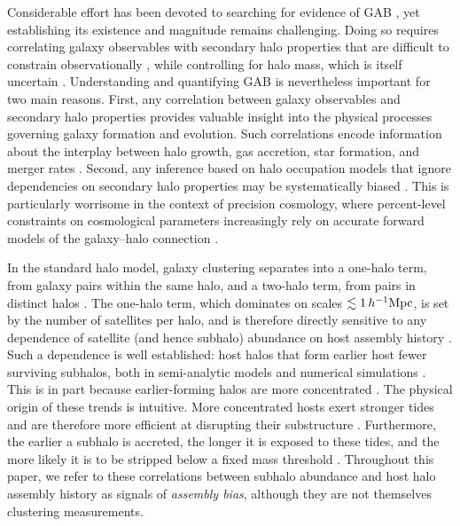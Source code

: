 \documentclass[twocolumn,apj,numberedappendix,twocolappendix,iop]{openjournal}
\begin{document}
Considerable effort has been devoted to searching for evidence of GAB \citep{Yang.etal.06, Berlind.etal.06, Tinker.etal.08, Hearin.etal.16, Zu.Mandelbaum.18}, yet establishing its existence and magnitude remains challenging. Doing so requires correlating galaxy observables with secondary halo properties that are difficult to constrain observationally \citep{Miyatake.etal.16, Zu.etal.17, Lin.etal.16, Sunayama.More.19}, while controlling for halo mass, which is itself uncertain \citep{Campbell.etal.15, Old.etal.15}. Understanding and quantifying GAB is nevertheless important for two main reasons. First, any correlation between galaxy observables and secondary halo properties provides valuable insight into the physical processes governing galaxy formation and evolution. Such correlations encode information about the interplay between halo growth, gas accretion, star formation, and merger rates \citep{Somerville.etal.15, Behroozi.etal.19}. Second, any inference based on halo occupation models that ignore dependencies on secondary halo properties may be systematically biased \citep{Zentner.etal.14, Hearin.etal.15}. This is particularly worrisome in the context of precision cosmology, where percent-level constraints on cosmological parameters increasingly rely on accurate forward models of the galaxy--halo connection \citep{Weinberg.etal.13, Hearin.etal.16, Mitra.vdBosch.25}.

In the standard halo model, galaxy clustering separates into a one-halo term, from galaxy pairs within the same halo, and a two-halo term, from pairs in distinct halos \citep{Seljak.00, Cooray.Sheth.02, vdBosch.etal.13}. The one-halo term, which dominates on scales $\lesssim 1\,h^{-1}{\rm Mpc}$, is set by the number of satellites per halo, and is therefore directly sensitive to any dependence of satellite (and hence subhalo) abundance on host assembly history \citep{Zentner.etal.14, Hearin.etal.16}. Such a dependence is well established: host halos that form earlier host fewer surviving subhalos, both in semi-analytic models \citep{Zentner.etal.05, vdBosch.etal.05a, Jiang.vdBosch.17} and numerical simulations \citep[][]{Zhu.etal.06, Giocoli.etal.08, Ishiyama.etal.09}. This is in part because earlier-forming halos are more concentrated \citep[][]{Wechsler.etal.02, Zhao.etal.09, Mao.etal.15}. The physical origin of these trends is intuitive. More concentrated hosts exert stronger tides and are therefore more efficient at disrupting their substructure \citep{vdBosch.etal.18a}. Furthermore, the earlier a subhalo is accreted, the longer it is exposed to these tides, and the more likely it is to be stripped below a fixed mass threshold \citep{Jiang.vdBosch.16, Mao.etal.15}. Throughout this paper, we refer to these correlations between subhalo abundance and host halo assembly history as signals of \textit{assembly bias}, although they are not themselves clustering measurements.
\end{document}

